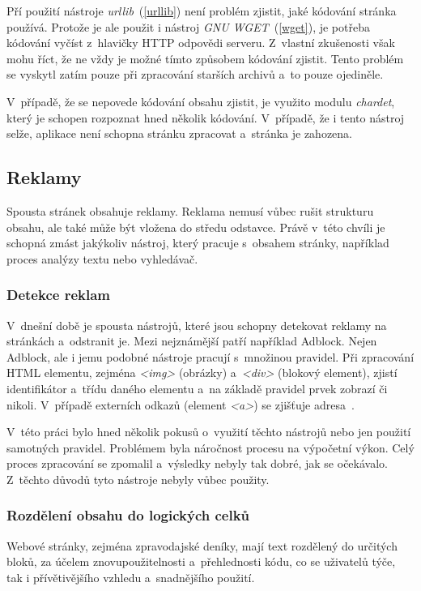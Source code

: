 Pří použití nástroje \textit{urllib}~(\ref{urllib}) není problém zjistit, jaké kódování stránka používá. Protože je ale použit
i nástroj \textit{GNU WGET}~(\ref{wget}), je potřeba kódování vyčíst z~hlavičky HTTP odpovědi serveru. Z~vlastní zkušenosti však mohu říct, že
ne vždy je možné tímto způsobem kódování zjistit. Tento problém se vyskytl zatím pouze při zpracování starších archivů a~to pouze ojediněle.

V~případě, že se nepovede kódování obsahu zjistit, je využito modulu \textit{chardet}, který je schopen rozpoznat
hned několik kódování. V~případě, že i tento nástroj selže, aplikace není schopna stránku zpracovat a~stránka je zahozena.

\subsection{Reklamy}
Spousta stránek obsahuje reklamy. Reklama nemusí vůbec rušit strukturu obsahu, ale také může být vložena do středu
odstavce. Právě v~této chvíli je schopná zmást jakýkoliv nástroj, který pracuje s~obsahem stránky,
například proces analýzy textu nebo vyhledávač.

\subsubsection{Detekce reklam}
V~dnešní době je spousta nástrojů, které jsou schopny detekovat reklamy na stránkách a~odstranit je. Mezi nejznámější
patří například Adblock. Nejen Adblock, ale i jemu podobné nástroje pracují s~množinou pravidel. Při zpracování HTML
elementu, zejména \textit{<img>} (obrázky) a~\textit{<div>} (blokový element), zjistí identifikátor a~třídu daného elementu a~na
základě pravidel prvek zobrazí či nikoli. V~případě externích odkazů (element \textit{<a>}) se zjišťuje adresa~\cite{ADBLOCK}.

V~této práci bylo hned několik pokusů o~využití těchto nástrojů nebo jen použití samotných pravidel. Problémem byla náročnost procesu
na výpočetní výkon. Celý proces zpracování se zpomalil a~výsledky nebyly tak dobré, jak se očekávalo. Z~těchto důvodů tyto nástroje
nebyly vůbec použity.

\subsubsection{Rozdělení obsahu do logických celků}
Webové stránky, zejména zpravodajské deníky, mají text rozdělený do určitých bloků, za účelem
znovupoužitelnosti a~přehlednosti kódu, co se uživatelů týče, tak i přívětivějšího vzhledu a~snadnějšího použití.

